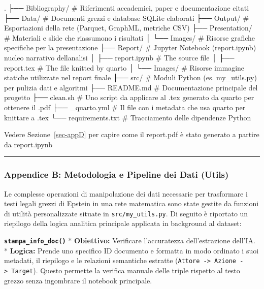 \documentclass[
  italian,
  a4paper,
]{article}
\newenvironment{Shaded}{\begin{snugshade}}{\end{snugshade}}
\newcommand{\NormalTok}[1]{\textcolor[rgb]{0.00,0.23,0.31}{#1}}
\begin{document}
\begin{Shaded}
\begin{Highlighting}[]
\NormalTok{.}
\NormalTok{├── Bibliography/       \# Riferimenti accademici, paper e documentazione citati}
\NormalTok{├── Data/               \# Documenti grezzi e database SQLite elaborati}
\NormalTok{├── Output/             \# Esportazioni della rete (Parquet, GraphML, metriche CSV)}
\NormalTok{├── Presentation/       \# Materiali e slide che riassumono i risultati}
\NormalTok{│   └── Images/         \# Risorse grafiche specifiche per la presentazione}
\NormalTok{├── Report/             \# Jupyter Notebook (report.ipynb) nucleo narrativo dell\textquotesingle{}analisi}
\NormalTok{│   ├── report.ipynb    \# The source file}
\NormalTok{│   ├── report.tex      \# The file knitted by quarto}
\NormalTok{│   └── Images/         \# Risorse immagine statiche utilizzate nel report finale}
\NormalTok{├── src/                \# Moduli Python (es. my\_utils.py) per pulizia dati e algoritmi}
\NormalTok{├── README.md           \# Documentazione principale del progetto}
\NormalTok{├── clean.sh            \# Uno script da applicare al .tex generato da quarto per ottenere il .pdf}
\NormalTok{├── \_quarto.yml         \# Il file con i metadata che usa quarto per knittare a .tex}
\NormalTok{└── requirements.txt    \# Tracciamento delle dipendenze Python}
\end{Highlighting}
\end{Shaded}

Vedere Sezione~\ref{sec-appD} per capire come il report.pdf è stato
generato a partire da report.ipynb

\begin{center}\rule{0.5\linewidth}{0.5pt}\end{center}

\subsubsection{Appendice B: Metodologia e Pipeline dei Dati
(Utils)}\label{sec-utils}

Le complesse operazioni di manipolazione dei dati necessarie per
trasformare i testi legali grezzi di Epstein in una rete matematica sono
state gestite da funzioni di utilità personalizzate situate in
\texttt{src/my\_utils.py}. Di seguito è riportato un riepilogo della
logica analitica principale applicata in background al dataset:

\textbf{\texttt{stampa\_info\_doc()}} * \textbf{Obiettivo:} Verificare
l'accuratezza dell'estrazione dell'IA. * \textbf{Logica:} Prende uno
specifico ID documento e formatta in modo ordinato i suoi metadati, il
riepilogo e le relazioni semantiche estratte
(\texttt{Attore\ -\textgreater{}\ Azione\ -\textgreater{}\ Target}).
Questo permette la verifica manuale delle triple rispetto al testo
grezzo senza ingombrare il notebook principale.
\end{document}
